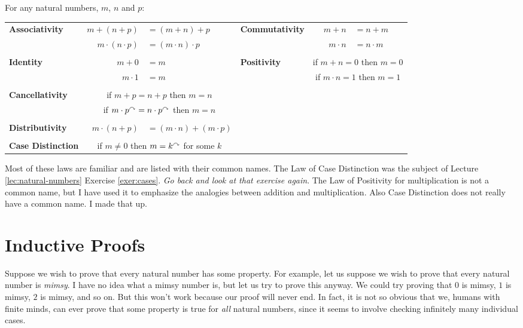 \begin{laws}
\noindent For any natural numbers, $m$, $n$ and $p$:

\begin{tabular}{lr@{\,}l@{\qquad}lr@{\,}l}
\textbf{Associativity}& $m + (n + p)$      &$= (m+n)+p$           &\textbf{Commutativity}&$m + n$    &$= n + m$\\
                      &$m \cdot(n\cdot p)$ &$= (m\cdot n)\cdot p$ &                      &$m\cdot n$ &$= n\cdot m$\\
&&&&&\\ 
\textbf{Identity}&$m + 0$    &$= m$&\textbf{Positivity}&\multicolumn{2}{c}{if $m + n = 0$ then $m=0$}\\
                 &$m\cdot 1$ &$= m$&                   &\multicolumn{2}{c}{if $m\cdot n = 1$ then $m=1$}\\
&&&&&\\
\textbf{Cancellativity}&\multicolumn{2}{c}{if $m + p = n+p$ then $m=n$}&&&\\
                       &\multicolumn{2}{c}{if $m \cdot p^\curvearrowright = n\cdot p^\curvearrowright$ then $m=n$}&&&\\
&&&&&\\
\textbf{Distributivity}&$m\cdot(n+p)$&$= (m\cdot n) + (m\cdot p)$&&&\\
&&&&&\\
\textbf{Case Distinction}&\multicolumn{2}{c}{if $m\neq 0$ then $m=k^\curvearrowright$ for some $k$}&&&\\
\end{tabular}
\end{laws}
\medskip

Most of these laws are familiar and are listed with their common names. The Law of Case
Distinction was the subject of Lecture \ref{lec:natural-numbers} Exercise \ref{exer:cases}. \emph{Go back and look at that exercise again}.
The Law of Positivity for multiplication is not a common name, but
I have used it to emphasize the analogies between addition and multiplication.
Also Case Distinction does not really have a common name. I made that up.

\ipadbreak

\section{Inductive Proofs}

Suppose we wish to prove that every natural number has some
property. For example, let us suppose we wish to prove that every
natural number is \emph{mimsy}.  I have no idea what a mimsy number
is, but let us try to prove this anyway. We could try proving that $0$
is mimsy, $1$ is mimsy, $2$ is mimsy, and so on.  But this won't work
because our proof will never end. In fact, it is not so obvious that
we, humans with finite minds, can ever prove that some property is
true for \emph{all} natural numbers, since it seems to involve
checking infinitely many individual cases.

